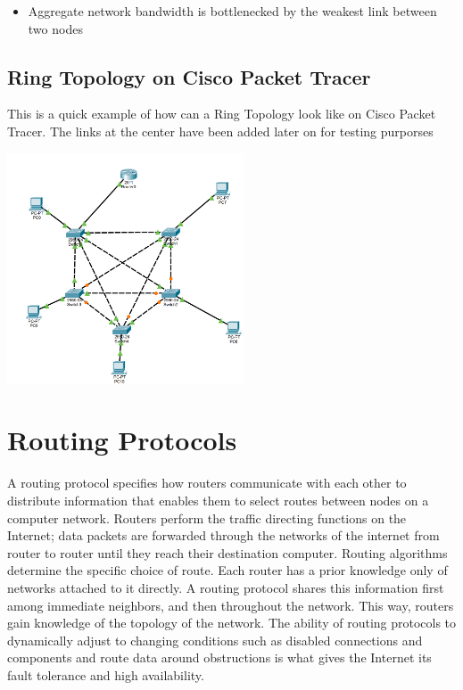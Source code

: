 \documentclass[a4paper,12pt]{book}
\begin{document}
\begin{itemize}
\item {Aggregate network bandwidth is bottlenecked by the weakest link between two nodes}
\end{itemize}

\clearpage
\subsection{Ring Topology on Cisco Packet Tracer}

This is a quick example of how can a Ring Topology look like on Cisco Packet Tracer. The links at the center have been added later on for testing purporses

\noindent \includegraphics[width=7cm]{./star-topology/screenshot.PNG} \newline

\section{Routing Protocols}

A routing protocol specifies how routers communicate with each other to distribute information that enables them to select routes between nodes on a computer network. Routers perform the traffic directing functions on the Internet; data packets are forwarded through the networks of the internet from router to router until they reach their destination computer. Routing algorithms determine the specific choice of route. Each router has a prior knowledge only of networks attached to it directly. A routing protocol shares this information first among immediate neighbors, and then throughout the network. This way, routers gain knowledge of the topology of the network. The ability of routing protocols to dynamically adjust to changing conditions such as disabled connections and components and route data around obstructions is what gives the Internet its fault tolerance and high availability. \newline
\end{document}
